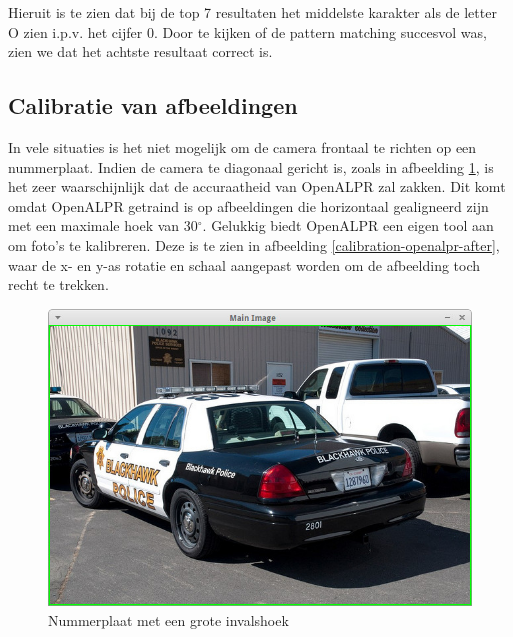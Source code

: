 Hieruit is te zien dat bij de top 7 resultaten het middelste karakter als de letter O zien i.p.v. het cijfer 0. Door te kijken of de pattern matching succesvol was, zien we dat het achtste resultaat correct is.

\subsection{Calibratie van afbeeldingen}
\label{alprcalib}
In vele situaties is het niet mogelijk om de camera frontaal te richten op een nummerplaat. Indien de camera te diagonaal gericht is, zoals in afbeelding \ref{calibration-openalpr}, is het zeer waarschijnlijk dat de accuraatheid van OpenALPR zal zakken. Dit komt omdat OpenALPR getraind is op afbeeldingen die horizontaal gealigneerd zijn met een maximale hoek van 30$^{\circ}$. Gelukkig biedt OpenALPR een eigen tool aan om foto's te kalibreren. Deze is te zien in afbeelding \ref{calibration-openalpr-after}, waar de x- en y-as rotatie en schaal aangepast worden om de afbeelding toch recht te trekken.

\begin{figure}[h!]
	\centering
	\includegraphics[width=0.7\linewidth]{img/calibration/configuration_calibration_before.jpg}
	\caption{Nummerplaat met een grote invalshoek \autocite{openalpr2015pattern}}
	\label{calibration-openalpr}
\end{figure}

